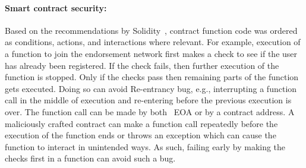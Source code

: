 \paragraph{Smart contract security:}Based on the recommendations by
Solidity~\cite{soliditySecurity}, contract function code was ordered as
conditions, actions, and interactions where relevant. For example, execution of
a function to join the endorsement network first makes a check to see if the
user has already been registered. If the check fails, then further execution of
the function is stopped. Only if the checks pass then remaining parts of the
function gets executed. Doing so can avoid Re-entrancy bug, e.g., interrupting
a function call in the middle of execution and re-entering before the previous
execution is over. The function call can be made by both ~\ac{EOA} or by a
contract address. A maliciously crafted contract can make a function call
repeatedly before the execution of the function ends or throws an exception
which can cause the function to interact in unintended ways. As such, failing
early by making the checks first in a function can avoid such a bug. 
